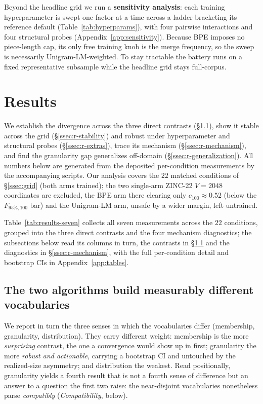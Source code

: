 \documentclass{article}
\begin{document}
Beyond the headline grid we run a \textbf{sensitivity analysis}: each training
hyperparameter is swept one-factor-at-a-time across a ladder bracketing its
reference default (Table~\ref{tab:hyperparams}), with four
pairwise interactions and four structural probes
(Appendix~\ref{app:sensitivity}). Because BPE imposes no piece-length cap, its
only free training knob is the merge frequency, so the sweep is necessarily
Unigram-LM-weighted. To stay tractable the battery runs on a fixed representative
subsample while the headline grid stays full-corpus.

\section{Results}\label{sec:results}

We establish the divergence across the three direct contrasts
(\S\ref{ssec:r-jaccard}), show it stable across the grid
(\S\ref{ssec:r-stability}) and robust under hyperparameter and structural
probes (\S\ref{ssec:r-extras}), trace its mechanism (\S\ref{ssec:r-mechanism}),
and find the granularity gap generalizes off-domain
(\S\ref{ssec:r-generalization}). All numbers below are generated from the
deposited per-condition measurements by the accompanying scripts. Our analysis
covers the $22$ matched conditions of \S\ref{ssec:grid} (both arms trained); the
two single-arm ZINC-22 $V{=}2048$ coordinates are excluded, the BPE arm there
clearing only $c_{100} \approx 0.52$ (below the $F_{95\%,100}$ bar) and the Unigram-LM arm, unsafe by a wider
margin, left untrained.

Table~\ref{tab:results-seven} collects all seven measurements across the $22$
conditions, grouped into the three direct contrasts and the four mechanism
diagnostics; the subsections below read its columns in turn, the contrasts in
\S\ref{ssec:r-jaccard} and the diagnostics in \S\ref{ssec:r-mechanism}, with the
full per-condition detail and bootstrap CIs in Appendix~\ref{app:tables}.



\subsection{The two algorithms build measurably different
vocabularies}\label{ssec:r-jaccard}

We report in turn the three senses in which the vocabularies differ (membership,
granularity, distribution). They carry different weight: membership is the more
\emph{surprising} contrast, the one a convergence would show up in first;
granularity the more \emph{robust and actionable}, carrying a bootstrap CI and
untouched by the realized-size asymmetry; and distribution the weakest. Read
positionally, granularity yields a fourth result that is not a fourth sense of
difference but an answer to a question the first two raise: the near-disjoint
vocabularies nonetheless parse \emph{compatibly} (\emph{Compatibility}, below).
\end{document}
